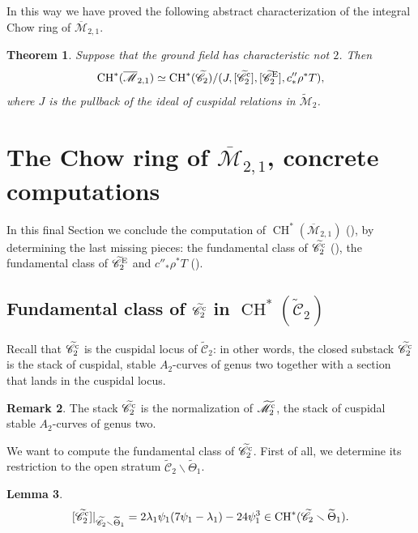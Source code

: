 \documentclass[a4paper, 10pt]{amsart}
\numberwithin{equation}{section}
\numberwithin{subsection}{section}
\newtheorem{theorem}{Theorem}[section]
\newtheorem{lemma}[theorem]{Lemma}
\theoremstyle{definition}
\newtheorem{remark}[theorem]{Remark}
\theoremstyle{remark}
\renewcommand{\mathcal}{\mathscr}
\newcommand\cM{\mathcal{M}} \newcommand\cN{\mathcal{N}}
\renewcommand{\setminus}{\smallsetminus}
\newcommand{\Mbar}{\overline{\cM}}
\newcommand{\Mtilde}{\widetilde{\mathcal M}}
\newcommand{\Ctilde}{\widetilde{\mathcal C}}
\newcommand{\ThTilde}{\widetilde{\Theta}}
\newcommand{\ch}[1][*]{\operatorname{CH}^{#1}}
\begin{document}
	In this way we have proved the following abstract characterization of the integral Chow ring of $\Mbar_{2,1}$.
	\begin{theorem}\label{thm:chow Mbar21 abs}
		Suppose that the ground field has characteristic not $2$. Then
		\[ \ch(\Mbar_{2,1}) \simeq \ch(\Ctilde_2)/(J,[\Ctilde_2^{\rm c}],[\Ctilde_2^{\rm E}],c''_*\rho^*T), \]
		where $J$ is the pullback of the ideal of cuspidal relations in $\Mtilde_2$.
	\end{theorem}
	
	\section{The Chow ring of $\Mbar_{2,1}$, concrete computations}\label{sec:concrete}
	In this final Section we conclude the computation of $\ch(\Mbar_{2,1})$ (), by determining the last missing pieces: the fundamental class of $\Ctilde_2^{\rm c}$ (), the fundamental class of $\Ctilde_2^{\rm E}$ and $c''_*\rho^*T$ ().
	
	\subsection{Fundamental class of $\Ctilde_2^{\rm c}$ in $\ch(\Ctilde_2)$}
	Recall that $\Ctilde_2^{\rm c}$ is the cuspidal locus of $\Ctilde_2$: in other words, the closed substack $\Ctilde_2^{\rm c}$ is the stack of cuspidal, stable $A_2$-curves of genus two together with a section that lands in the cuspidal locus.
	\begin{remark}
		The stack $\Ctilde_2^{\rm c}$ is the normalization of $\Mtilde_2^{\rm c}$, the stack of cuspidal stable $A_2$-curves of genus two.
	\end{remark}
	We want to compute the fundamental class of $\Ctilde_2^{\rm c}$. First of all, we determine its restriction to the open stratum $\Ctilde_2 \setminus \ThTilde_1$.
	
	\begin{lemma}\label{lm:cusp in Ctilde2 minus ThTilde1}
		$$ [\Ctilde_2^{\rm c}]\vert_{\Ctilde_2 \setminus \ThTilde_1} = 2\lambda_1\psi_1(7\psi_1-\lambda_1) - 24 \psi_1^3 \in \ch(\Ctilde_2 \setminus \ThTilde_1).$$
	\end{lemma}
	
\end{document}
